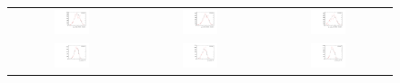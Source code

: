 \begin{figure}
\begin{tabular}{ccc}
\includegraphics[width=0.3\textwidth]{ANA_resources/Plots/Monte_carlo/data_vs_MC/weight/Kpi/log10(D0K_IPCHI2_OWNPV)_2012.pdf} & \includegraphics[width=0.3\textwidth]{ANA_resources/Plots/Monte_carlo/data_vs_MC/weight/Kpi/log10(D0Pi_IPCHI2_OWNPV)_2012.pdf} & \includegraphics[width=0.3\textwidth]{ANA_resources/Plots/Monte_carlo/data_vs_MC/weight/Kpi/log10(KstarPi_IPCHI2_OWNPV)_2012.pdf} \\
\includegraphics[width=0.3\textwidth]{ANA_resources/Plots/Monte_carlo/data_vs_MC/weight/Kpi/log10(D0K_PT)_2012.pdf} & \includegraphics[width=0.3\textwidth]{ANA_resources/Plots/Monte_carlo/data_vs_MC/weight/Kpi/log10(D0Pi_PT)_2012.pdf} & \includegraphics[width=0.3\textwidth]{ANA_resources/Plots/Monte_carlo/data_vs_MC/weight/Kpi/log10(KstarK_PT)_2012.pdf} \\

\end{tabular}
\end{figure}
